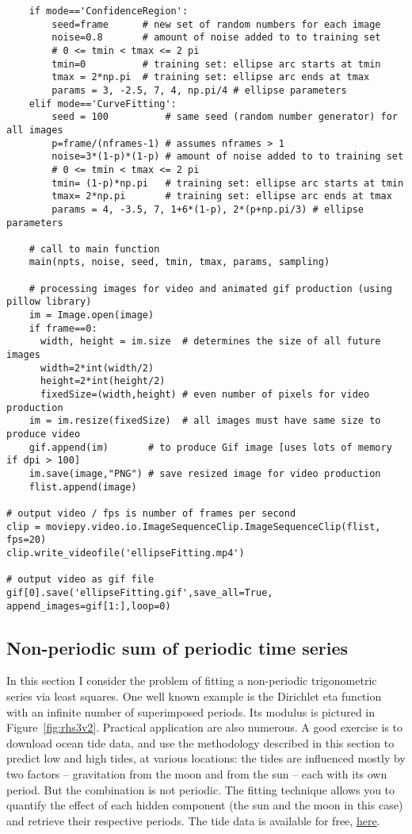 \documentclass[oneside,10pt]{book}
\begin{document}
\begin{lstlisting}
    if mode=='ConfidenceRegion':
        seed=frame      # new set of random numbers for each image
        noise=0.8       # amount of noise added to to training set
        # 0 <= tmin < tmax <= 2 pi
        tmin=0          # training set: ellipse arc starts at tmin
        tmax = 2*np.pi  # training set: ellipse arc ends at tmax
        params = 3, -2.5, 7, 4, np.pi/4 # ellipse parameters
    elif mode=='CurveFitting':
        seed = 100          # same seed (random number generator) for all images
        p=frame/(nframes-1) # assumes nframes > 1
        noise=3*(1-p)*(1-p) # amount of noise added to to training set
        # 0 <= tmin < tmax <= 2 pi
        tmin= (1-p)*np.pi   # training set: ellipse arc starts at tmin
        tmax= 2*np.pi       # training set: ellipse arc ends at tmax
        params = 4, -3.5, 7, 1+6*(1-p), 2*(p+np.pi/3) # ellipse parameters

    # call to main function
    main(npts, noise, seed, tmin, tmax, params, sampling)

    # processing images for video and animated gif production (using pillow library)
    im = Image.open(image)
    if frame==0:
      width, height = im.size  # determines the size of all future images
      width=2*int(width/2)
      height=2*int(height/2)
      fixedSize=(width,height) # even number of pixels for video production
    im = im.resize(fixedSize)  # all images must have same size to produce video
    gif.append(im)       # to produce Gif image [uses lots of memory if dpi > 100]
    im.save(image,"PNG") # save resized image for video production
    flist.append(image)

# output video / fps is number of frames per second
clip = moviepy.video.io.ImageSequenceClip.ImageSequenceClip(flist, fps=20)
clip.write_videofile('ellipseFitting.mp4')

# output video as gif file
gif[0].save('ellipseFitting.gif',save_all=True, append_images=gif[1:],loop=0)
\end{lstlisting}

\subsection{Non-periodic sum of periodic time series}

In this section I consider the problem of fitting a \textcolor{index}{non-periodic trigonometric series} via least squares. One  well known example
is the Dirichlet eta function with an infinite number of superimposed periods. Its modulus is pictured in Figure~\ref{fig:rhs3v2}.
Practical application are also numerous. A good exercise
 is to download ocean tide data, and use the methodology described in this section to predict low and high tides, at various locations: the tides are influenced mostly by two factors --
 gravitation from the moon and from the sun -- each with its own period. But the combination is not periodic. The fitting technique allows you
 to quantify the effect of each hidden component (the sun and the moon in this case) and retrieve their respective periods.
The tide data is available
 for free, \href{https://tidesandcurrents.noaa.gov/}{here}.
\end{document}
